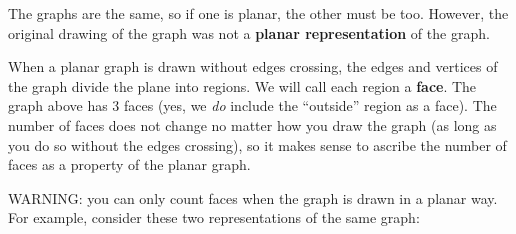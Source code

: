 \documentclass[10pt,]{book}
\newcommand{\terminology}[1]{\textbf{#1}}
\theoremstyle{plain}
\theoremstyle{definition}
\theoremstyle{definition}
\theoremstyle{definition}
\theoremstyle{definition}
\numberwithin{equation}{chapter}
\begin{document}
\par
\hypertarget{p-1593}{}%
The graphs are the same, so if one is planar, the other must be too. However, the original drawing of the graph was not a \terminology{planar representation} of the graph.%
\par
\hypertarget{p-1594}{}%
When a planar graph is drawn without edges crossing, the edges and vertices of the graph divide the plane into regions. We will call each region a \terminology{face}. The graph above has 3 faces (yes, we \emph{do} include the ``outside'' region as a face). The number of faces does not change no matter how you draw the graph (as long as you do so without the edges crossing), so it makes sense to ascribe the number of faces as a property of the planar graph.%
\par
\hypertarget{p-1595}{}%
WARNING: you can only count faces when the graph is drawn in a planar way. For example, consider these two representations of the same graph:%
\end{document}
